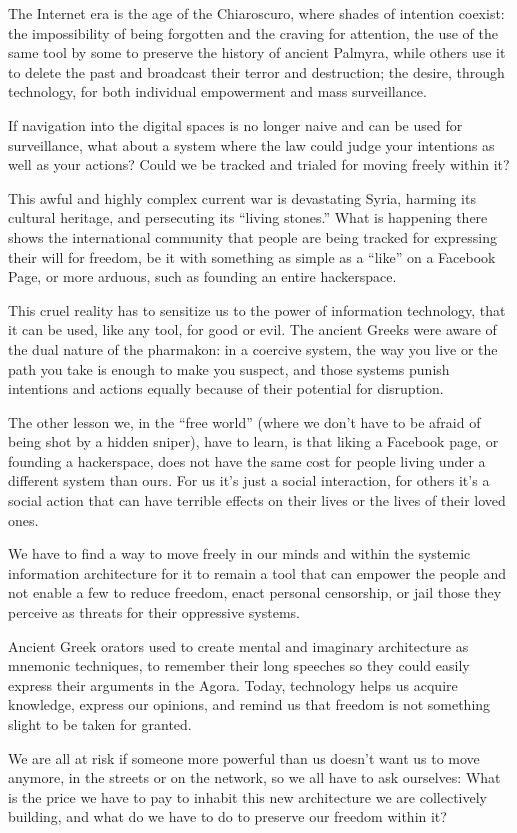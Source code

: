The Internet era is the age of the Chiaroscuro, where shades of
intention coexist: the impossibility of being forgotten and the craving
for attention, the use of the same tool by some to preserve the history
of ancient Palmyra, while others use it to delete the past and broadcast
their terror and destruction; the desire, through technology, for both
individual empowerment and mass surveillance.

If navigation into the digital spaces is no longer naive and can be used
for surveillance, what about a system where the law could judge your
intentions as well as your actions? Could we be tracked and trialed for
moving freely within it?

This awful and highly complex current war is devastating Syria, harming
its cultural heritage, and persecuting its ``living stones.'' What is
happening there shows the international community that people are being
tracked for expressing their will for freedom, be it with something as
simple as a ``like'' on a Facebook Page, or more arduous, such as
founding an entire hackerspace.

This cruel reality has to sensitize us to the power of information
technology, that it can be used, like any tool, for good or evil. The
ancient Greeks were aware of the dual nature of the pharmakon: in a
coercive system, the way you live or the path you take is enough to make
you suspect, and those systems punish intentions and actions equally
because of their potential for disruption.

The other lesson we, in the ``free world'' (where we don't have to be
afraid of being shot by a hidden sniper), have to learn, is that liking
a Facebook page, or founding a hackerspace, does not have the same cost
for people living under a different system than ours. For us it's just a
social interaction, for others it's a social action that can have
terrible effects on their lives or the lives of their loved ones.

We have to find a way to move freely in our minds and within the
systemic information architecture for it to remain a tool that can
empower the people and not enable a few to reduce freedom, enact
personal censorship, or jail those they perceive as threats for their
oppressive systems.

Ancient Greek orators used to create mental and imaginary architecture
as mnemonic techniques, to remember their long speeches so they could
easily express their arguments in the Agora. Today, technology helps us
acquire knowledge, express our opinions, and remind us that freedom is
not something slight to be taken for granted.

We are all at risk if someone more powerful than us doesn't want us to
move anymore, in the streets or on the network, so we all have to ask
ourselves: What is the price we have to pay to inhabit this new
architecture we are collectively building, and what do we have to do to
preserve our freedom within it?
